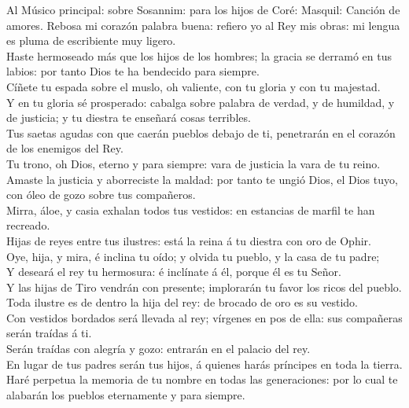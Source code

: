  Al Músico principal: sobre Sosannim: para los hijos de
Coré: Masquil: Canción de amores. Rebosa mi corazón palabra buena:
refiero yo al Rey mis obras: mi lengua es pluma de escribiente muy
ligero.\\
 Haste hermoseado más que los hijos de los hombres; la
gracia se derramó en tus labios: por tanto Dios te ha bendecido para
siempre.\\
 Cíñete tu espada sobre el muslo, oh valiente, con tu
gloria y con tu majestad.\\
 Y en tu gloria sé prosperado: cabalga sobre palabra de
verdad, y de humildad, y de justicia; y tu diestra te enseñará cosas
terribles.\\
 Tus saetas agudas con que caerán pueblos debajo de ti,
penetrarán en el corazón de los enemigos del Rey.\\
 Tu trono, oh Dios, eterno y para siempre: vara de
justicia la vara de tu reino.\\
 Amaste la justicia y aborreciste la maldad: por tanto te
ungió Dios, el Dios tuyo, con óleo de gozo sobre tus compañeros.\\
 Mirra, áloe, y casia exhalan todos tus vestidos: en
estancias de marfil te han recreado.\\
 Hijas de reyes entre tus ilustres: está la reina á tu
diestra con oro de Ophir.\\
 Oye, hija, y mira, é inclina tu oído; y olvida tu
pueblo, y la casa de tu padre;\\
 Y deseará el rey tu hermosura: é inclínate á él, porque
él es tu Señor.\\
 Y las hijas de Tiro vendrán con presente; implorarán tu
favor los ricos del pueblo.\\
 Toda ilustre es de dentro la hija del rey: de brocado de
oro es su vestido.\\
 Con vestidos bordados será llevada al rey; vírgenes en
pos de ella: sus compañeras serán traídas á ti.\\
 Serán traídas con alegría y gozo: entrarán en el palacio
del rey.\\
 En lugar de tus padres serán tus hijos, á quienes harás
príncipes en toda la tierra.\\
 Haré perpetua la memoria de tu nombre en todas las
generaciones: por lo cual te alabarán los pueblos eternamente y para
siempre.

